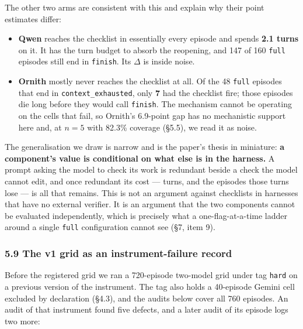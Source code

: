 \documentclass[
  10pt,
  a4paper,
]{article}
\providecommand{\tightlist}{%
  \setlength{\itemsep}{0pt}\setlength{\parskip}{0pt}}
\let\oldtexttt\texttt
\renewcommand{\texttt}[1]{{\small\oldtexttt{#1}}}
\begin{document}
The other two arms are consistent with this and explain why their point
estimates differ:

\begin{itemize}
\tightlist
\item
  \textbf{Qwen} reaches the checklist in essentially every episode and
  spends \textbf{2.1 turns} on it. It has the turn budget to absorb the
  reopening, and 147 of 160 \texttt{full} episodes still end in
  \texttt{finish}. Its \(\Delta\) is inside noise.
\item
  \textbf{Ornith} mostly never reaches the checklist at all. Of the 48
  \texttt{full} episodes that end in \texttt{context\_exhausted}, only
  \textbf{7} had the checklist fire; those episodes die long before they
  would call \texttt{finish}. The mechanism cannot be operating on the
  cells that fail, so Ornith's 6.9-point gap has no mechanistic support
  here and, at \(n=5\) with 82.3\% coverage (§5.5), we read it as noise.
\end{itemize}

The generalisation we draw is narrow and is the paper's thesis in
miniature: \textbf{a component's value is conditional on what else is in
the harness.} A prompt asking the model to check its work is redundant
beside a check the model cannot edit, and once redundant its cost ---
turns, and the episodes those turns lose --- is all that remains. This
is not an argument against checklists in harnesses that have no external
verifier. It is an argument that the two components cannot be evaluated
independently, which is precisely what a one-flag-at-a-time ladder
around a single \texttt{full} configuration cannot see (§7, item 9).

\subsubsection{5.9 The v1 grid as an instrument-failure
record}\label{the-v1-grid-as-an-instrument-failure-record}

Before the registered grid we ran a 720-episode two-model grid under tag
\texttt{hard} on a previous version of the instrument. The tag also
holds a 40-episode Gemini cell excluded by declaration (§4.3), and the
audits below cover all 760 episodes. An audit of that instrument found
five defects, and a later audit of its episode logs two more:
\end{document}
